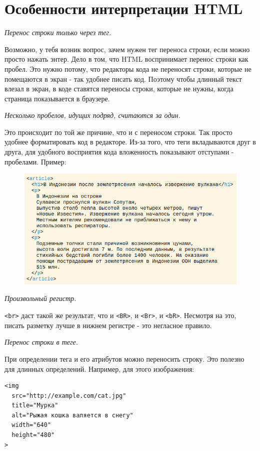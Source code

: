 \documentclass[14pt]{extreport}
\begin{document}
\section{Особенности интерпретации HTML}

\emph{Перенос строки только через тег.}

Возможно, у тебя возник вопрос, зачем нужен тег переноса строки, если можно просто нажать энтер. Дело в том, что HTML воспринимает перенос строки как пробел. Это нужно потому, что редакторы кода не переносят﻿ строки, которые не помещаются в экран - так удобнее писать код. Поэтому чтобы длинный текст влезал в экран, в коде ставятся переносы строки, которые не нужны, когда страница показывается в браузере.

\emph{Несколько пробелов, идущих подряд, считаются за один.}

Это происходит по той же причине, что и с переносом строки. Так просто удобнее форматировать код в редакторе. Из-за того, что теги вкладываются друг в друга, для удобного восприятия кода вложенность показывают отступами - пробелами. Пример:

\begin{figure}[H]
\centerline{\includegraphics[width=0.8\linewidth]{pics_practice/interpretation_HTML.png}}
\caption{}
\label{2}
\end{figure}

\emph{Произвольный регистр.}

\texttt{<br>} даст такой же результат, что и \texttt{<BR>}, и \texttt{<Br>}, и \texttt{<bR>}. Несмотря на это, писать разметку лучше в нижнем регистре - это негласное правило.

\emph{Перенос строки в теге.}

При определении тега и его атрибутов можно переносить строку. Это полезно для длинных определений.
Например, для этого изображения:
\begin{verbatim}
<img
  src="http://example.com/cat.jpg"
  title="Мурка"
  alt="Рыжая кошка валяется в снегу"
  width="640"
  height="480"
>
\end{verbatim}
\end{document}
